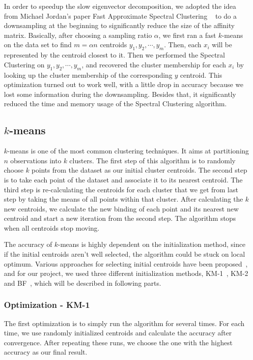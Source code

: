 \documentclass{acm_proc_article-sp}
\begin{document}
In order to speedup the slow eigenvector decomposition, we adopted the idea from Michael Jordan's paper Fast Approximate Spectral Clustering ~\cite{yan2009fast} to do a downsampling at the beginning to significantly reduce the size of the affinity matrix. Basically, after choosing a sampling ratio $\alpha$, we first ran a fast $k$-means on the data set to find $m = \alpha n$ centroids $y_1, y_2, \cdots, y_m$. Then, each $x_i$ will be represented by the centroid closest to it. Then we performed the Spectral Clustering on $y_1, y_2, \cdots, y_m$, and recovered the cluster membership for each $x_i$ by looking up the cluster membership of the corresponding $y$ centroid. This optimization turned out to work well, with a little drop in accuracy because we lost some information during the downsampling. Besides that, it significantly reduced the time and memory usage of the Spectral Clustering algorithm.

\subsection{$k$-means}
$k$-means is one of the most common clustering techniques. It aims at partitioning $n$ observations into $k$ clusters. The first step of this algorithm is to randomly choose $k$ points from the dataset as our initial cluster centroids. The second step is to take each point of the dataset and associate it to its nearest centroid. The third step is re-calculating the centroids for each cluster that we get from last step by taking the means of all points within that cluster. After calculating the $k$ new centroids, we calculate the new binding of each point and its nearest new centroid and start a new iteration from the second step. The algorithm stops when all centroids stop moving.

The accuracy of $k$-means is highly dependent on the initialization method, since if the initial centroids aren't well selected, the algorithm could be stuck on local optimum. Various approaches for selecting initial centroids have been proposed~\cite{kanungo2002efficient, arthur2007k, khan2004cluster}, and for our project, we used three different initialization methods, KM-1~\cite{hartigan1979algorithm}, KM-2~\cite{yan2009fast} and BF~\cite{bradley1998refining}, which will be described in following parts.

\subsubsection{Optimization - KM-1}
The first optimization is to simply run the algorithm for several times. For each time, we use randomly initialized centroids and calculate the accuracy after convergence. After repeating these runs, we choose the one with the highest accuracy as our final result.
\end{document}
